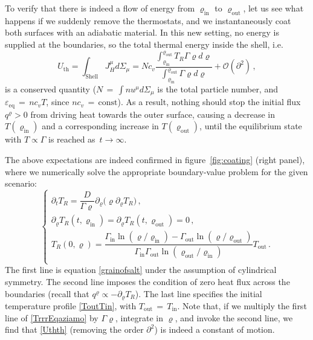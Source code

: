 \documentclass[a4paper, amsfonts, amssymb, amsmath, reprint, showkeys, nofootinbib, twoside, onecolumn,notitlepage]{revtex4-1}
\theoremstyle{definition}
\theoremstyle{theorem}
\begin{document}
To verify that there is indeed a flow of energy from $\varrho_{\text{in}}$ to $\varrho_{\text{out}}$, let us see what happens if we suddenly remove the thermostats, and we instantaneously coat both surfaces with an adiabatic material. In this new setting, no energy is supplied at the boundaries, so the total thermal energy inside the shell, i.e.
\begin{equation}\label{Uthth}
U_{\text{th}}=\int_{\text{Shell}}  J_H^\mu d\Sigma_\mu = Nc_v \dfrac{\int_{\varrho_{\text{in}}}^{\varrho_{\text{out}}} T_R \Gamma \varrho d\varrho}{\int_{\varrho_{\text{in}}}^{\varrho_{\text{out}}} \Gamma \varrho d\varrho} +\mathcal{O}(\partial^2) \, ,
\end{equation}
is a conserved quantity \cite[\S 3.3.2]{PoissonToolkit2009pwt} ($N\,{=}\,\int nu^\mu d\Sigma_\mu$ is the total particle number, and $\varepsilon_{\text{eq}}\,{=}\,nc_vT$, since $nc_v\,{=}\,\text{const}$).
As a result, nothing should stop the initial flux $q^\varrho>0$ from driving heat towards the outer surface, causing a decrease in $T(\varrho_{\text{in}})$  and a corresponding increase in $T(\varrho_{\text{out}})$, until the equilibrium state with $T\propto \Gamma$ is reached as~$t\rightarrow \infty$. 

The above expectations are indeed confirmed in figure~\ref{fig:coating} (right panel), where we numerically solve the appropriate boundary-value problem for the given scenario:
\begin{equation}\label{TrrrEqaziamo}
\begin{cases}
\partial_{t} T_R=  \dfrac{D}{ \Gamma \varrho} \partial_{\varrho} \big( \varrho \partial_{\varrho} T_R\big) \, , \\
\partial_{\varrho} T_R(t,\varrho_{\text{in}})= \partial_\varrho T_R(t,\varrho_{\text{out}})=0 \, ,\\
T_R(0,\varrho)=\dfrac{\Gamma_{\text{in}} \ln(\varrho/\varrho_{\text{in}})- \Gamma_{\text{out}} \ln(\varrho/\varrho_{\text{out}})}{\Gamma_{\text{in}}\Gamma_{\text{out}} \ln(\varrho_{\text{out}}/\varrho_{\text{in}})} T_{\text{out}}   \, .\\
\end{cases} 
\end{equation}
The first line is equation \eqref{grainofsalt} under the assumption of cylindrical symmetry. The second line imposes the condition of zero heat flux across the boundaries (recall that $q^\varrho \propto -\partial_\varrho T_R$). The last line specifies the initial temperature profile \eqref{ToutTin}, with $T_{\text{out}}\,{=}\,T_{\text{in}}$. Note that, if we multiply the first line of \eqref{TrrrEqaziamo} by $\Gamma \varrho$, integrate in $\varrho$, and invoke the second line, we find that \eqref{Uthth} (removing the order $\partial^2$) is indeed a constant of motion.
\end{document}
